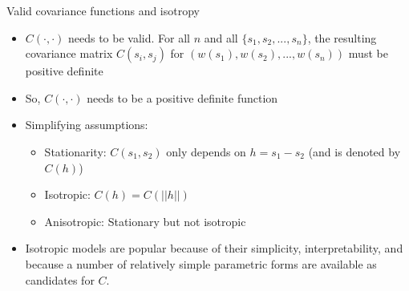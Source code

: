 \documentclass[xcolor=pdftex,dvipsnames,table,numbers,hyperref={pdfpagelabels=false},compress]{beamer}
\newcommand{\blue}[1]{{\color{RoyalBlue!90} #1}}
\newcommand{\red}[1]{{\color{Red} #1}}
\newcommand{\green}[1]{{\color{Green} #1}}
\begin{document}
\begin{frame}{Valid covariance functions and isotropy}
	
	\begin{itemize}
		
		\item $C(\cdot,\cdot)$ needs to be \red{valid}.  For all $n$ and all $\{s_{1}, s_{2},..., s_{n}\}$, the resulting
		covariance matrix $C(s_i,s_j)$ for $(w(s_{1}), w(s_{2}),..., w(s_{n}))$ must be positive definite
		
		\item So, $C(\cdot,\cdot)$ needs to be a \blue{positive definite} function
		
		\item Simplifying assumptions: 
		\begin{itemize}
			\item \alert{Stationarity:} $C(s_1,s_2)$ only depends on $h = s_1 - s_2$ (and is denoted by $C(h)$)
			\item \alert{Isotropic:} $C(h) = C(||h||)$
			\item \alert{Anisotropic:} Stationary but not isotropic
		\end{itemize}
		
		\item Isotropic models are popular because of their \green{ simplicity, interpretability,} and because a number of relatively \green{ simple parametric forms} are available as candidates for $C$.
		
	\end{itemize}
\end{frame}
\end{document}
